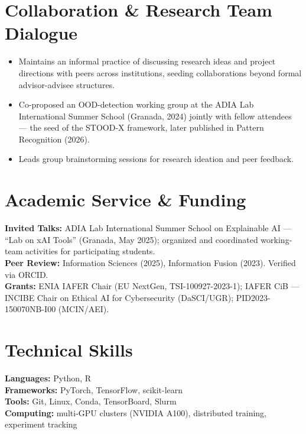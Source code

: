 \documentclass[10pt,a4paper]{article}
\newcommand{\blueitem}[1]{\textcolor{subtitleblue}{\textbf{#1}}}
\begin{document}
\section*{Collaboration \& Research Team Dialogue}

\begin{itemize}
    \item Maintains an informal practice of discussing research ideas and project directions with peers across institutions, seeding collaborations beyond formal advisor-advisee structures.
    \item Co-proposed an OOD-detection working group at the ADIA Lab International Summer School (Granada, 2024) jointly with fellow attendees --- the seed of the STOOD-X framework, later published in Pattern Recognition (2026).
    \item Leads group brainstorming sessions for research ideation and peer feedback.
\end{itemize}

\section*{Academic Service \& Funding}

\blueitem{Invited Talks:} ADIA Lab International Summer School on Explainable AI --- ``Lab on xAI Tools'' (Granada, May 2025); organized and coordinated working-team activities for participating students. \\
\blueitem{Peer Review:} Information Sciences (2025), Information Fusion (2023). Verified via ORCID. \\
\blueitem{Grants:} ENIA IAFER Chair (EU NextGen, TSI-100927-2023-1); IAFER CiB --- INCIBE Chair on Ethical AI for Cybersecurity (DaSCI/UGR); PID2023-150070NB-I00 (MCIN/AEI).

\section*{Technical Skills}

\blueitem{Languages:} Python, R \\
\blueitem{Frameworks:} PyTorch, TensorFlow, scikit-learn \\
\blueitem{Tools:} Git, Linux, Conda, TensorBoard, Slurm \\
\blueitem{Computing:} multi-GPU clusters (NVIDIA A100), distributed training, experiment tracking
\end{document}
